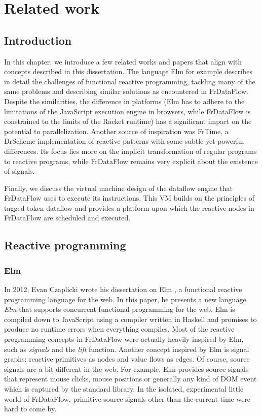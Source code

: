 \chapter{Related work}

\section{Introduction}

In this chapter, we introduce a few related works and papers that align with concepts described in this dissertation. The language Elm for example describes in detail the challenges of functional reactive programming, tackling many of the same problems and describing similar solutions as encountered in FrDataFlow. Despite the similarities, the difference in platforms (Elm has to adhere to the limitations of the JavaScript execution engine in browsers, while FrDataFlow is constrained to the limits of the Racket runtime) has a significant impact on the potential to parallelization. Another source of inspiration was FrTime, a DrScheme implementation of reactive patterns with some subtle yet powerful differences. Its focus lies more on the implicit transformation of regular programs to reactive programs, while FrDataFlow remains very explicit about the existence of signals.

Finally, we discuss the virtual machine design of the dataflow engine that FrDataFlow uses to execute its instructions. This VM builds on the principles of tagged token dataflow and provides a platform upon which the reactive nodes in FrDataFlow are scheduled and executed. 

\section{Reactive programming}

\subsection{Elm}

In 2012, Evan Czaplicki wrote his dissertation on Elm \citep{czaplicki_elm:_2012}, a functional reactive programming language for the web. In this paper, he presents a new language \textit{Elm} that supports concurrent functional programming for the web. Elm is compiled down to JavaScript using a compiler written in Haskell and promises to produce no runtime errors when everything compiles. 
Most of the reactive programming concepts in FrDataFlow were actually heavily inspired by Elm, such as \textit{signals} and the \textit{lift} function. 
Another concept inspired by Elm is signal graphs: reactive primitives as nodes and value flows as edges. Of course, source signals are a bit different in the web. For example, Elm provides source signals that represent mouse clicks, mouse positions or generally any kind of DOM event which is captured by the standard library. In the isolated, experimental little world of FrDataFlow, primitive source signals other than the current time were hard to come by. 

